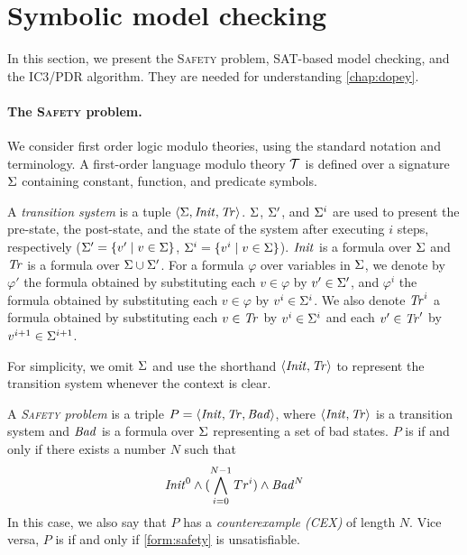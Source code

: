 \section{Symbolic model checking}
\newcommand{\safety}{\textsc{Safety}\xspace}
In this section, we present the \safety problem, SAT-based model checking, and the IC3/PDR algorithm. They are needed for understanding \cref{chap:dopey}.
\paragraph{The \safety problem.}

We consider first order logic modulo theories, using the standard notation and terminology. A first-order language modulo theory $\mathcal{T}$ is defined over a signature $\Sigma$ containing constant, function, and predicate symbols. 

A \emph{transition system} is a tuple $\langle \Sigma, \mathit{Init},
\mathit{Tr} \rangle$.
$\Sigma$, $\Sigma'$, and $\Sigma^i$ are used to present the pre-state, the post-state, and the state of the system after executing $i$ steps, respectively ($\Sigma' = \{v' \mid v \in \Sigma\}$, $\Sigma^i = \{v^i \mid v \in \Sigma\}$). 
$\mathit{Init}$ is a formula over $\Sigma$ and $\mathit{Tr}$ is a formula over $\Sigma \cup \Sigma'$. For a formula $\varphi$ over variables in $\Sigma$, we denote by $\varphi'$ the formula obtained by substituting each $v \in \varphi$ by $v' \in \Sigma'$, and $\varphi^i$ the formula obtained by substituting each $v \in \varphi$ by $v^i \in \Sigma^i$. We also denote $\mathit{Tr}^i$ a formula obtained by substituting each $v \in \mathit{Tr}$ by $v^i \in \Sigma^i$ and each $v' \in \mathit{Tr}'$ by $v^{i+1} \in \Sigma^{i+1}$.


For simplicity, we omit $\Sigma$ and use the shorthand $\langle \mathit{Init}, \mathit{Tr}\rangle$ to represent the
transition system whenever the context is clear.

A \emph{\safety problem} is a triple 
$P = \langle \mathit{Init}, \mathit{Tr}, \mathit{Bad} \rangle$, where
$\langle \mathit{Init}, \mathit{Tr} \rangle$ is a transition system and $\mathit{Bad}$ is a
formula over $\Sigma$ representing a set of bad states. $P$ is \unsafe if and only if there exists a number $N$ such that
\begin{align}
\label{form:safety}
    \mathit{Init}^0\land (\bigwedge^{N-1}_{i=0}Tr^i)\land \mathit{Bad}^N
\end{align}
In this case, we also say that $P$ has a \emph{counterexample (CEX)} of length $N$. Vice versa, $P$ is \safe if and only if \cref{form:safety} is unsatisfiable.



